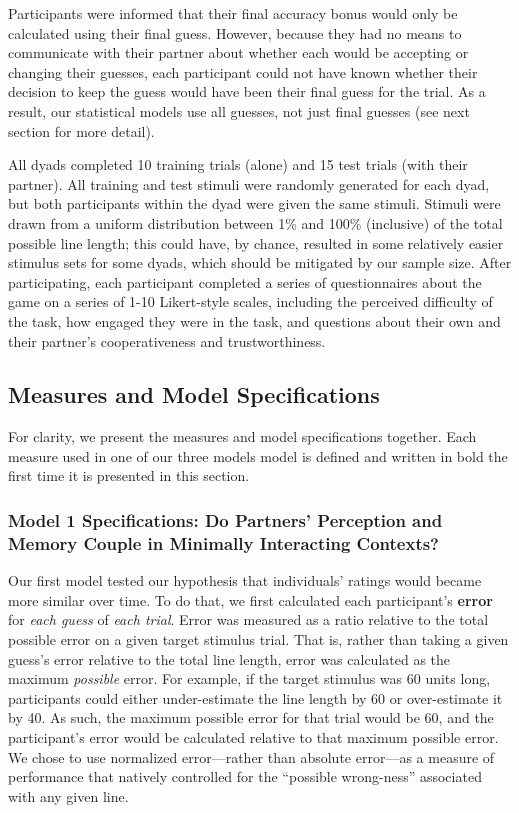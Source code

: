 \documentclass[10pt, letterpaper]{article}
\begin{document}
Participants were informed that their final accuracy bonus would only be
calculated using their final guess. However, because they had no means
to communicate with their partner about whether each would be accepting
or changing their guesses, each participant could not have known whether
their decision to keep the guess would have been their final guess for
the trial. As a result, our statistical models use all guesses, not just
final guesses (see next section for more detail).

All dyads completed 10 training trials (alone) and 15 test trials (with
their partner). All training and test stimuli were randomly generated
for each dyad, but both participants within the dyad were given the same
stimuli. Stimuli were drawn from a uniform distribution between 1\% and
100\% (inclusive) of the total possible line length; this could have, by
chance, resulted in some relatively easier stimulus sets for some dyads,
which should be mitigated by our sample size. After participating, each
participant completed a series of questionnaires about the game on a
series of 1-10 Likert-style scales, including the perceived difficulty
of the task, how engaged they were in the task, and questions about
their own and their partner's cooperativeness and trustworthiness.

\subsection{Measures and Model
Specifications}\label{measures-and-model-specifications}

For clarity, we present the measures and model specifications together.
Each measure used in one of our three models model is defined and
written in bold the first time it is presented in this section.

\subsubsection{Model 1 Specifications: Do Partners' Perception and
Memory Couple in Minimally Interacting
Contexts?}\label{model-1-specifications-do-partners-perception-and-memory-couple-in-minimally-interacting-contexts}

Our first model tested our hypothesis that individuals' ratings would
became more similar over time. To do that, we first calculated each
participant's \textbf{error} for \emph{each guess} of \emph{each trial}.
Error was measured as a ratio relative to the total possible error on a
given target stimulus trial. That is, rather than taking a given guess's
error relative to the total line length, error was calculated as the
maximum \emph{possible} error. For example, if the target stimulus was
60 units long, participants could either under-estimate the line length
by 60 or over-estimate it by 40. As such, the maximum possible error for
that trial would be 60, and the participant's error would be calculated
relative to that maximum possible error. We chose to use normalized
error---rather than absolute error---as a measure of performance that
natively controlled for the ``possible wrong-ness'' associated with any
given line.
\end{document}
